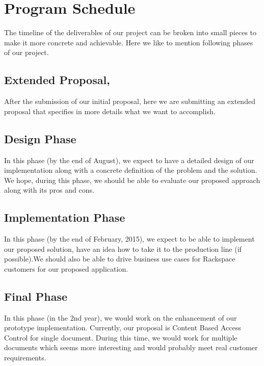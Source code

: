\section{Program Schedule}
The timeline of the deliverables of our project can be broken into small pieces to make it more concrete and achievable.  Here we like to mention following phases of our project.

\subsection{Extended Proposal,}
After the submission of our initial proposal, here we are submitting an extended proposal that  specifies in more details what we want to accomplish.

\subsection{Design Phase}
In this phase (by the end of August), we expect to have a  detailed design of our implementation along with a concrete definition of the  problem and the solution. We hope, during this phase, we should be able to evaluate our proposed approach along with its pros and cons. 

\subsection{ Implementation Phase}
In this phase (by the end of  February, 2015), we expect to be able to implement our proposed solution, have an idea how to take it to the production line (if possible).We should also be able to drive business use cases for Rackspace customers for our proposed application.

\subsection{Final Phase}
In this phase (in the 2nd year), we would work on the enhancement of our prototype implementation. Currently, our proposal is Content Based Access Control for single document. During this time, we would work for multiple documents which seems more interesting and would probably meet real customer requirements.


